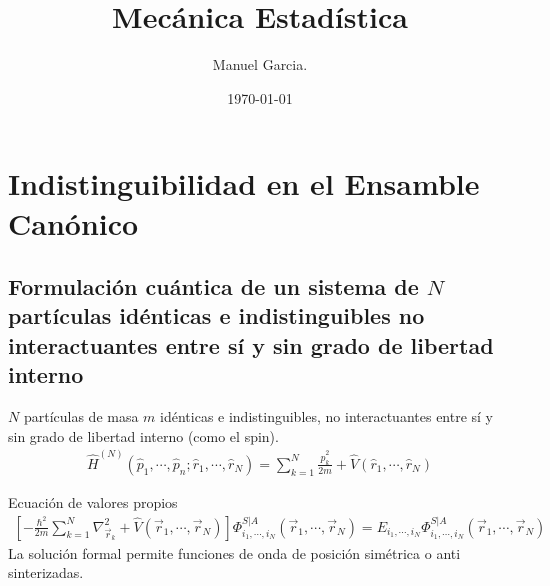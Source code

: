 \documentclass{article}
\title{Mecánica Estadística }
\author{Manuel Garcia.}
\date{\today}
\begin{document}
\maketitle

\section{Indistinguibilidad en el Ensamble Canónico }
\subsection{Formulación cuántica de un sistema de $ N  $ partículas idénticas e indistinguibles no interactuantes entre sí y sin grado de libertad interno  }
$ N  $ partículas de masa $ m  $ idénticas e indistinguibles, no interactuantes entre sí y sin grado de libertad interno (como el spin). 
\begin{gather*}
  \hat H ^ {(N) } (\hat p_1, \cdots , \hat p_n ; \hat r _1 , \cdots , \hat r_N ) = \displaystyle\sum_{k = 1 }^{ N } \frac{\hat p_k ^2 }{2m } + \hat V (\hat r_1, \cdots , \hat r_N ) 
\end{gather*}

Ecuación de valores propios 
\begin{gather*}
  \left[- \frac{\hbar ^2 }{2m } \displaystyle\sum_{k= 1 }^{N }\nabla^2 _{\vec r_k } + \hat V (\vec r_1 , \cdots , \vec r_N ) \right] \Phi ^ {S|A } _{i_1,\cdots, i_N } (\vec r_1 , \cdots, \vec r _N ) = E _{i_1,\cdots , i_N } \Phi ^ {S|A } _{i_1,\cdots, i_N } (\vec r_1 , \cdots, \vec r _N )
\end{gather*}
La solución formal permite funciones de onda de posición simétrica o anti sinterizadas.

\end{document}
